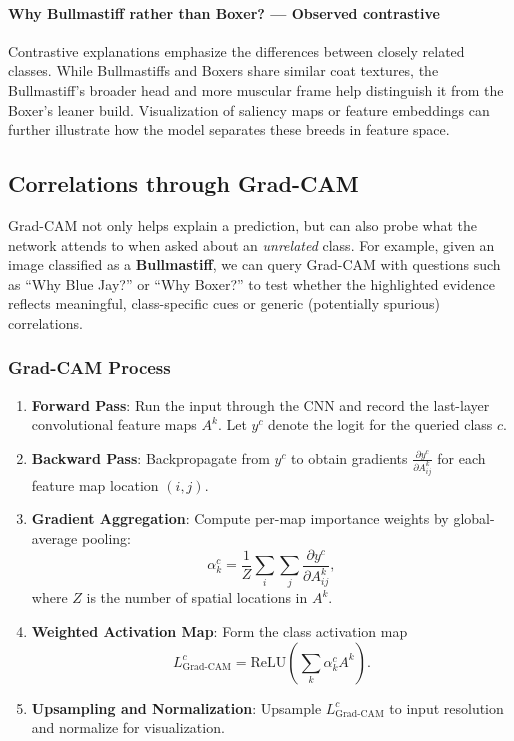 \documentclass{article}
\begin{document}
\paragraph{Why Bullmastiff rather than Boxer? — Observed contrastive}
Contrastive explanations emphasize the differences between closely related classes. While Bullmastiffs and Boxers share similar coat textures, the Bullmastiff’s broader head and more muscular frame help distinguish it from the Boxer’s leaner build. Visualization of saliency maps or feature embeddings can further illustrate how the model separates these breeds in feature space.

\subsection{Correlations through Grad-CAM}
Grad-CAM not only helps explain a prediction, but can also probe what the network
attends to when asked about an \emph{unrelated} class. For example, given an image
classified as a \textbf{Bullmastiff}, we can query Grad-CAM with questions such as
``Why Blue Jay?'' or ``Why Boxer?'' to test whether the highlighted evidence reflects
meaningful, class-specific cues or generic (potentially spurious) correlations.

\subsubsection*{Grad-CAM Process}
\begin{enumerate}
  \item \textbf{Forward Pass}: Run the input through the CNN and record the last-layer
  convolutional feature maps \(A^k\). Let \(y^c\) denote the logit for the queried class \(c\).

  \item \textbf{Backward Pass}: Backpropagate from \(y^c\) to obtain gradients
  \(\frac{\partial y^c}{\partial A^k_{ij}}\) for each feature map location \((i,j)\).

  \item \textbf{Gradient Aggregation}: Compute per-map importance weights by global-average pooling:
  \[
    \alpha_k^c = \frac{1}{Z}\sum_{i}\sum_{j}\frac{\partial y^c}{\partial A^k_{ij}},
  \]
  where \(Z\) is the number of spatial locations in \(A^k\).

  \item \textbf{Weighted Activation Map}: Form the class activation map
  \[
    L_{\text{Grad-CAM}}^c = \mathrm{ReLU}\!\left(\sum_k \alpha_k^c A^k\right).
  \]

  \item \textbf{Upsampling and Normalization}: Upsample \(L_{\text{Grad-CAM}}^c\) to input resolution
  and normalize for visualization.
\end{enumerate}
\end{document}
